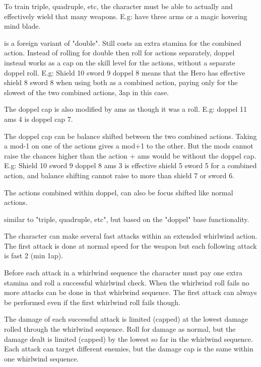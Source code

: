 To train triple, quadruple, etc, the character must be able to actually and effectively wield that many weapons. E.g: have three arms or a magic hovering mind blade.


 is a foreign variant of "double". Still costs an extra stamina for the combined action. Instead of rolling for double then roll for actions separately, doppel instead works as a cap on the skill level for the actions, without a separate doppel roll. E.g: Shield 10 sword 9 doppel 8 means that the Hero has effective shield 8 sword 8 when using both as a combined action, paying only for the slowest of the two combined actions, 3ap in this case.

The doppel cap is also modified by ams as though it was a roll. E.g: doppel 11 ams 4 is doppel cap 7.

The doppel cap can be balance shifted between the two combined actions. Taking a mod-1 on one of the actions gives a mod+1 to the other. But the mods cannot raise the chances higher than the action + ams would be without the doppel cap. E.g: Shield 10 sword 9 doppel 8 ams 3 is effective shield 5 sword 5 for a combined action, and balance shifting cannot raise to more than shield 7 or sword 6.

The actions combined within doppel, can also be focus shifted like normal actions.


 similar to "triple, quadruple, etc", but based on the "doppel" base functionality.


 The character can make several fast attacks within an extended whirlwind action. The first attack is done at normal speed for the weapon but each following attack is fast 2 (min 1ap).

Before each attack in a whirlwind sequence the character must pay one extra stamina and roll a successful whirlwind check. When the whirlwind roll fails no more attacks can be done in that whirlwind sequence. The first attack can always be performed even if the first whirlwind roll fails though.

The damage of each successful attack is limited (capped) at the lowest damage rolled through the whirlwind sequence. Roll for damage as normal, but the damage dealt is limited (capped) by the lowest so far in the whirlwind sequence. Each attack can target different enemies, but the damage cap is the same within one whirlwind sequence.

